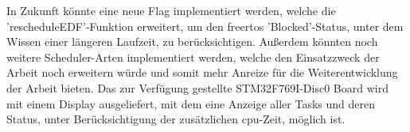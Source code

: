 \documentclass[../EDF Master Thesis.tex]{subfiles}
\begin{document}
    \clearpage

    In Zukunft könnte eine neue Flag implementiert werden, welche die 'rescheduleEDF'-Funktion erweitert, um den \ac{freertos} 'Blocked'-Status, unter dem Wissen einer längeren Laufzeit, zu berücksichtigen. 
    Außerdem könnten noch weitere Scheduler-Arten implementiert werden, welche den Einsatzzweck der Arbeit noch erweitern würde und somit mehr Anreize für die Weiterentwicklung der Arbeit bieten.
    Das zur Verfügung gestellte STM32F769I-Disc0 Board wird mit einem Display ausgeliefert, mit dem eine Anzeige aller Tasks und deren Status, unter Berücksichtigung der zusätzlichen \ac{cpu}-Zeit, möglich ist.
    
    
\end{document}
